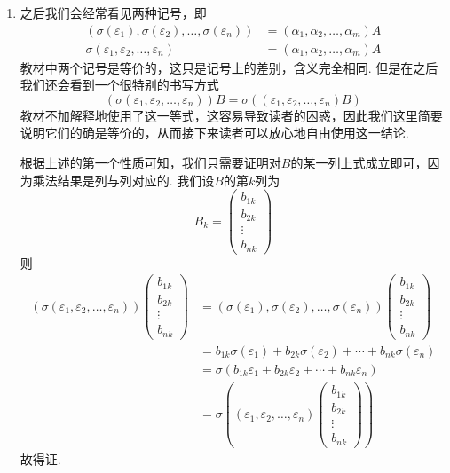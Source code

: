 \begin{enumerate}
    \item 之后我们会经常看见两种记号，即
          \begin{align*}
              (\sigma(\varepsilon_1),\sigma(\varepsilon_2),\ldots,\sigma(\varepsilon_n)) & =(\alpha_1,\alpha_2,\ldots,\alpha_m)A \\
              \sigma(\varepsilon_1,\varepsilon_2,\ldots,\varepsilon_n)                   & =(\alpha_1,\alpha_2,\ldots,\alpha_m)A
          \end{align*}
          教材中两个记号是等价的，这只是记号上的差别，含义完全相同. 但是在之后我们还会看到一个很特别的书写方式
          \[(\sigma(\varepsilon_1,\varepsilon_2,\ldots,\varepsilon_n))B=\sigma((\varepsilon_1,\varepsilon_2,\ldots,\varepsilon_n)B)\]
          教材不加解释地使用了这一等式，这容易导致读者的困惑，因此我们这里简要说明它们的确是等价的，从而接下来读者可以放心地自由使用这一结论.

          根据上述的第一个性质可知，我们只需要证明对$B$的某一列上式成立即可，因为乘法结果是列与列对应的. 我们设$B$的第$k$列为
          \[B_k=\begin{pmatrix}
                  b_{1k} \\ b_{2k} \\ \vdots \\ b_{nk}
              \end{pmatrix}\]
          则
          \begin{align*}
              (\sigma(\varepsilon_1,\varepsilon_2,\ldots,\varepsilon_n))
              \begin{pmatrix}
                  b_{1k} \\ b_{2k} \\ \vdots \\ b_{nk}
              \end{pmatrix}
               & =(\sigma(\varepsilon_1),\sigma(\varepsilon_2),\ldots,\sigma(\varepsilon_n))\begin{pmatrix}
                                                                                                b_{1k} \\ b_{2k} \\ \vdots \\ b_{nk}
                                                                                            \end{pmatrix} \\
               & =b_{1k}\sigma(\varepsilon_1)+b_{2k}\sigma(\varepsilon_2)+\cdots+b_{nk}\sigma(\varepsilon_n)                    \\
               & =\sigma(b_{1k}\varepsilon_1+b_{2k}\varepsilon_2+\cdots+b_{nk}\varepsilon_n)                                    \\
               & =\sigma((\varepsilon_1,\varepsilon_2,\ldots,\varepsilon_n)
              \begin{pmatrix}
                  b_{1k} \\ b_{2k} \\ \vdots \\ b_{nk}
              \end{pmatrix})
          \end{align*}
          故得证.
\end{enumerate}

